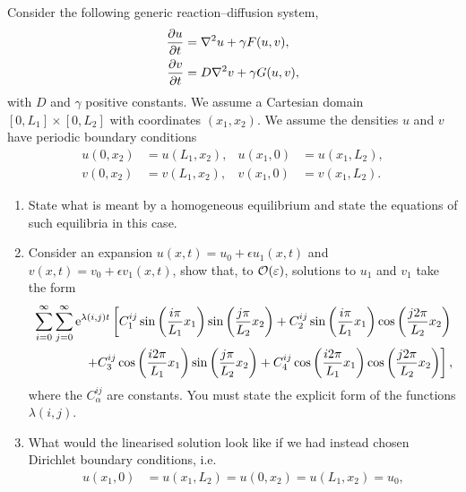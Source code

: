 \documentclass[a4paper, 12pt]{article}
\begin{document}
\begin{enumerate}[label={\bf \arabic{*}.\;}, ref={\arabic{*}},itemsep=3ex, left=0ex]
    {
      Consider the following generic reaction--diffusion system,
      \begin{subequations}
        \begin{align}
          \pd{u}{t} &= \nabla^2 u + \gamma F(u,v),\\
          \pd{v}{t} &=  D\nabla^2 v + \gamma G(u,v),
        \end{align}
      \end{subequations}
      with $D$ and $\gamma$ positive constants. We assume a Cartesian domain $[0,L_1]\times[0,L_2]$ with coordinates $(x_1,x_2)$. We assume the densities $u$ and $v$ have periodic boundary conditions
      \begin{align}
        u(0,x_2) &= u(L_1,x_2), & u(x_1,0) &= u(x_1,L_2),\nonumber\\
        v(0,x_2) &= v(L_1,x_2), & v(x_1,0) &= v(x_1,L_2).
      \end{align}
      \begin{enumerate}[label=(\alph*)]
        \item{State what is meant by a homogeneous equilibrium and state the equations of such equilibria in this case.
          }
        \item{
            Consider an expansion $u(x,t)= u_0 + \epsilon u_1(x,t)$ and $v(x,t)= v_0 + \epsilon v_1(x,t)$, show that, to $\mathcal{O}(\varepsilon)$, solutions to $u_1$ and $v_1$ take the form
            \begin{align}
              \sum_{i=0}^{\infty}\sum_{j=0}^{\infty}\mathrm{e}^{\lambda(i,j)t}\left[C_1^{ij}\sin\left(\frac{i\pi}{L_1}x_1\right)\sin\left(\frac{j\pi}{L_2}x_2\right) + C_2^{ij}\sin\left(\frac{i\pi}{L_1}x_1\right)\cos\left(\frac{j 2\pi}{L_2}x_2\right)\right.\nonumber \\
              \left. + C_3^{ij}\cos\left(\frac{i 2 \pi}{L_1}x_1\right)\sin\left(\frac{j \pi}{L_2}x_2\right)  + C_4^{ij}\cos\left(\frac{i 2\pi}{ L_1}x_1\right)\cos\left(\frac{j 2\pi}{L_2}x_2\right) \right],
            \end{align}
            where the $C_\alpha^{ij}$ are constants. You must state the explicit form of the functions $\lambda(i,j)$.
          }
        \item{What would the linearised solution look like if we had instead chosen Dirichlet boundary conditions, i.e.\
            \begin{align}
              u(x_1,0) &= u(x_1,L_2)  = u(0,x_2) = u(L_1,x_2)= u_0,\nonumber\\

\end{align}}
\end{enumerate}}
\end{enumerate}
\end{document}
